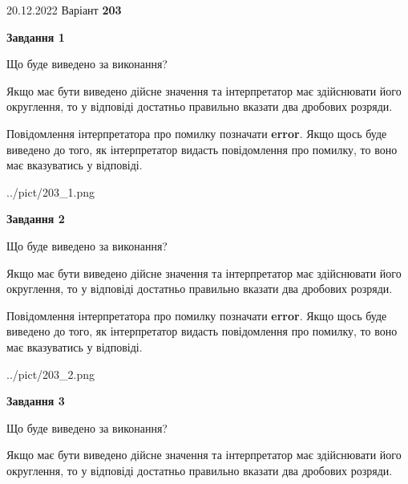 \documentclass[12pt, ukrainian]{article}
\begin{document}
{20.12.2022 Варіант \No \textbf { 203 }\par}
{
\begin {Large}

{\begin {center}\textbf{Завдання 1}\end {center}}\par
Що буде виведено за виконання? \par

Якщо має бути виведено дійсне значення та інтерпретатор має здійснювати його округлення, 
то у відповіді достатньо правильно вказати два дробових розряди.

Повідомлення інтерпретатора про помилку позначати \textbf{error}.
Якщо щось буде виведено до того, як інтерпретатор видасть повідомлення про помилку, 
то воно має вказуватись у відповіді. \par

\begin{center}
	{../pict/203_1.png}
\end{center}
\newpage

{\begin {center}\textbf{Завдання 2}\end {center}}\par
Що буде виведено за виконання? \par

Якщо має бути виведено дійсне значення та інтерпретатор має здійснювати його округлення, 
то у відповіді достатньо правильно вказати два дробових розряди.

Повідомлення інтерпретатора про помилку позначати \textbf{error}.
Якщо щось буде виведено до того, як інтерпретатор видасть повідомлення про помилку, 
то воно має вказуватись у відповіді. \par

\begin{center}
	{../pict/203_2.png}
\end{center}
\newpage

{\begin {center}\textbf{Завдання 3}\end {center}}\par
Що буде виведено за виконання? \par

Якщо має бути виведено дійсне значення та інтерпретатор має здійснювати його округлення, 
то у відповіді достатньо правильно вказати два дробових розряди.


\end{Large}}
\end{document}
